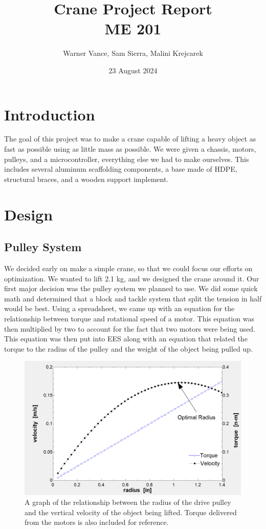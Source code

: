 \documentclass[twocolumn, letterpaper, 12pt, twoside]{article}
\title{%
    Crane Project Report \\
\large ME 201
}
\author{Warner Vance, Sam Sierra, Malini Krejcarek}
\date{23 August 2024}
\begin{document}
\maketitle

\section{Introduction}
The goal of this project was to make a crane capable of lifting a heavy object as fast as possible using as little mass as possible. 
We were given a chassis, motors, pulleys,  and a microcontroller, everything else we had to make ourselves. 
This includes several aluminum scaffolding components, a base made of HDPE, structural braces, and a wooden support implement. 

\section{Design}
\subsection{Pulley System}
\label{sec:Pulley}
We decided early on make a simple crane, so that we could focus our efforts on optimization.  
We wanted to lift 2.1 kg, and we designed the crane around it. 
Our first major decision was the pulley system we planned to use. 
We did some quick math and determined that a block and tackle system that split the tension in half would be best. 
Using a spreadsheet, we came up with an equation for the relationship between torque and rotational speed of a motor. 
This equation was then multiplied by two to account for the fact that two motors were being used. 
This equation was then put into EES along with an equation that related the torque to the radius of the pulley and the weight of the object being pulled up.

\begin{figure}[H]
    \centering
    \includegraphics[width =\linewidth]{Torque_Speed.png}
    \caption{A graph of the relationship between the radius of the drive pulley and the vertical velocity of the object being lifted. Torque delivered from the motors is also included for reference.}
    \label{fig:Torque_Speed}
\end{figure}
\end{document}
